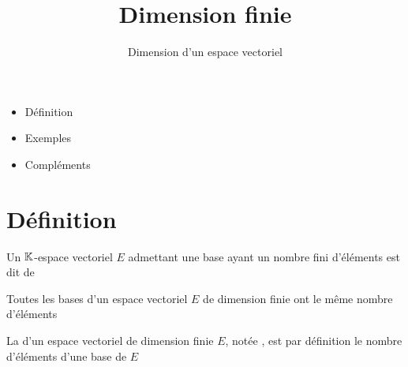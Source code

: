 

   





\title{{\bf Dimension finie}}
\subtitle{Dimension d'un espace vectoriel}

\begin{frame}
  
  \debutmontitre

  \pause

{\footnotesize
\hfill
{}
\begin{minipage}{0.6\textwidth}
  \begin{itemize}
    \item<3-> Définition
    \item<4-> Exemples
    \item<5-> Compléments
  \end{itemize}
\end{minipage}
}

\end{frame}

\setcounter{framenumber}{0}


\section{Définition}

\begin{frame}
\begin{mydefinition}
Un $\mathbb{K}$-espace vectoriel $E$ admettant une base ayant un nombre fini
d'éléments est dit de 
\end{mydefinition}
\pause
\begin{theoreme}[de la dimension]
Toutes les bases d'un espace vectoriel $E$ de dimension 
finie ont le même nombre d'éléments 
\end{theoreme}

\pause
\begin{mydefinition}
La  d'un espace vectoriel de dimension finie $E$, 
notée , est par définition le nombre d'éléments d'une base de $E$
\end{mydefinition}


\end{frame}




